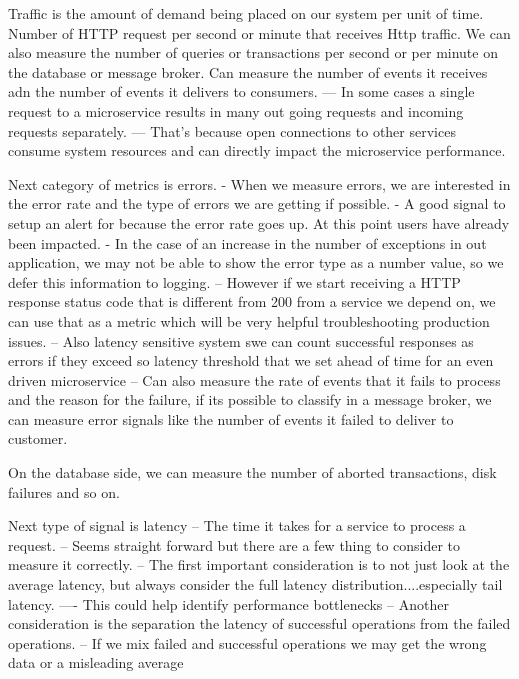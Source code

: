 \documentclass[a4paper, 11pt]{book}
\begin{document}
    Traffic is the amount of demand being placed on our system per unit of time.
    Number of HTTP request per second or minute that receives Http traffic.
    We can also measure the number of queries or transactions per second or per minute on the database or message broker.
    Can measure the number of events it receives adn the number of events it delivers to consumers.
    --- In some cases a single request to a microservice results in many out going requests and incoming requests separately.
    --- That's because open connections to other services consume system resources and can directly impact the microservice performance.

    Next category of metrics is errors.
    - When we measure errors, we are interested in the error rate and the type of errors we are getting if possible.
    - A good signal to setup an alert for because the error rate goes up.
    At this point users have already been impacted.
    - In the case of an increase in the number of exceptions in out application, we may not be able to show the error type as a number value, so we defer this information to logging.
    -- However if we start receiving a HTTP response status code that is different from 200 from a service we depend on, we can use that as a metric which will be very helpful troubleshooting production issues.
    -- Also latency sensitive system swe can count successful responses as errors if they exceed so latency threshold that we set ahead of time for an even driven microservice
    -- Can also measure the rate of events that it fails to process and the reason for the failure, if its possible to classify in a message broker, we can measure error signals like the number of events it failed to deliver to customer.

    On the database side, we can measure the number of aborted transactions, disk failures and so on.

    Next type of signal is latency
    -- The time it takes for a service to process a request.
    -- Seems straight forward but there are a few thing to consider to measure it correctly.
    -- The first important consideration is to not just look at the average latency, but always consider the full latency distribution....especially tail latency.
    ---- This could help identify performance bottlenecks
    -- Another consideration is the separation the latency of successful operations from the failed operations.
    -- If we mix failed and successful operations we may get the wrong data or a misleading average
\end{document}
